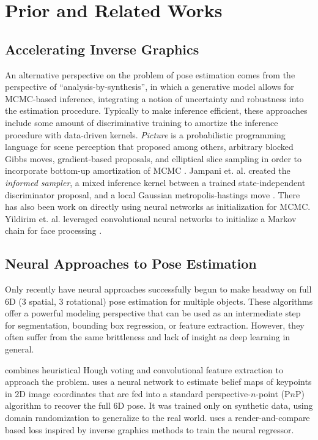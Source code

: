 
\section{Prior and Related Works}

  \subsection{Accelerating Inverse Graphics}

    An alternative perspective on the problem of pose estimation comes from the
    perspective of ``analysis-by-synthesis'', in which a generative model
    allows for MCMC-based inference, integrating a notion of uncertainty and
    robustness into the estimation procedure. Typically to make inference
    efficient, these approaches include some amount of discriminative training
    to amortize the inference procedure with data-driven kernels.
    \textit{Picture} is a probabilistic programming language for scene
    perception that proposed among others, arbitrary blocked Gibbs moves,
    gradient-based proposals, and elliptical slice sampling in order to
    incorporate bottom-up amortization of MCMC \cite{kulkarni2015picture}.
    Jampani et. al. created the \textit{informed sampler}, a mixed inference
    kernel between a trained state-independent discriminator proposal, and a
    local Gaussian metropolis-hastings move \cite{DBLP:journals/corr/JampaniNLG14}.
    There has also been work on directly using neural networks as
    initialization for MCMC. Yildirim et. al. leveraged convolutional neural
    networks to initialize a Markov chain for face processing
    \cite{yildirim2015efficient}. 

  \subsection{Neural Approaches to Pose Estimation}

    Only recently have neural approaches successfully begun to make headway on
    full 6D (3 spatial, 3 rotational) pose estimation for multiple objects.
    These algorithms offer a powerful modeling perspective that can be used as
    an intermediate step for segmentation, bounding box regression, or feature
    extraction. However, they often suffer from the same brittleness and
    lack of insight as deep learning in general.

    \cite{xiang2017posecnn} combines heuristical Hough voting and convolutional
    feature extraction to approach the problem. \cite{DBLP:journals/corr/abs-1809-10790}
    uses a neural network to estimate belief maps of keypoints in 2D image
    coordinates that are fed into a standard perspective-$n$-point (P$n$P)
    algorithm to recover the full 6D pose. It was trained only on synthetic
    data, using domain randomization to generalize to the real world.
    \cite{kundu20183d} uses a render-and-compare based loss inspired by inverse
    graphics methods to train the neural regressor.

